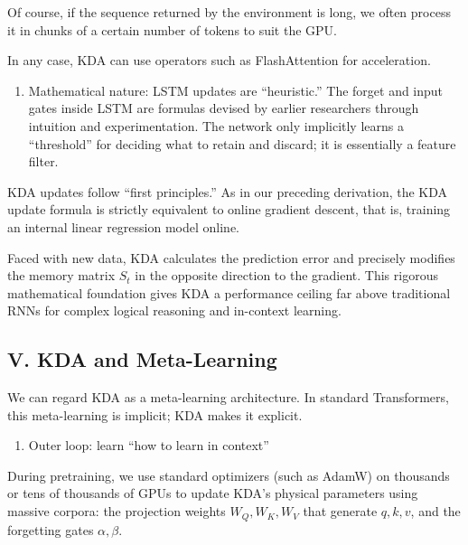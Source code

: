 Of course, if the sequence returned by the environment is long, we often process it in chunks of a certain number of tokens to suit the GPU.

In any case, KDA can use operators such as FlashAttention for acceleration.

\begin{enumerate}
\def\labelenumi{\arabic{enumi}.}
\setcounter{enumi}{2}
\tightlist
\item
  Mathematical nature: LSTM updates are ``heuristic.'' The forget and input gates inside LSTM are formulas devised by earlier researchers through intuition and experimentation. The network only implicitly learns a ``threshold'' for deciding what to retain and discard; it is essentially a feature filter.
\end{enumerate}

KDA updates follow ``first principles.'' As in our preceding derivation, the KDA update formula is strictly equivalent to online gradient descent, that is, training an internal linear regression model online.

Faced with new data, KDA calculates the prediction error and precisely modifies the memory matrix \(S_t\) in the opposite direction to the gradient. This rigorous mathematical foundation gives KDA a performance ceiling far above traditional RNNs for complex logical reasoning and in-context learning.

\hypertarget{v.-kda-and-meta-learning}{%
\subsection{V. KDA and Meta-Learning}\label{v.-kda-and-meta-learning}}

We can regard KDA as a meta-learning architecture. In standard Transformers, this meta-learning is implicit; KDA makes it explicit.

\begin{enumerate}
\def\labelenumi{\arabic{enumi}.}
\tightlist
\item
  Outer loop: learn ``how to learn in context''
\end{enumerate}

During pretraining, we use standard optimizers (such as AdamW) on thousands or tens of thousands of GPUs to update KDA's physical parameters using massive corpora: the projection weights \(W_Q,W_K,W_V\) that generate \(q,k,v\), and the forgetting gates \(\alpha,\beta\).


